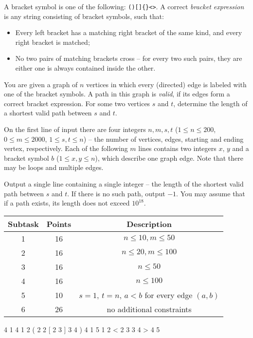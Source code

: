 










A bracket symbol is one of the following: \texttt{()[]\{\}<>}. A correct \textit{bracket expression} is any string consisting of bracket symbols, such that:
\begin{itemize}
 \item Every left bracket has a matching right bracket of the same kind, and every right bracket is matched;
 \item No two pairs of matching brackets cross -- for every two such pairs, they are either one is always contained inside the other.
\end{itemize}

You are given a graph of $n$ vertices in which every (directed) edge is labeled with one of the bracket symbols. A path in this graph is \textit{valid}, if its edges form a correct bracket expression. For some two vertices $s$ and $t$, determine the length of a shortest valid path between $s$ and $t$.



On the first line of input there are four integers $n, m, s, t$ ($1 \leq n \leq 200$, $0 \leq m \leq 2000$, $1 \leq s, t \leq n$) -- the number of vertices, edges, starting and ending vertex, respectively.
Each of the following $m$ lines contains two integers $x$, $y$ and a bracket symbol $b$ ($1 \leq x, y \leq n$), which describe one graph edge. Note that there may be loops and multiple edges.


Output a single line containing a single integer -- the length of the shortest valid path between $s$ and $t$. If there is no such path, output $-1$. You may assume that if a path exists, its length does not exceed $10^{18}$.


\begin{tabular}{|c|c|c|}
	\hline
	Subtask & Points  & Description \\
	\hline
	1 & 16 & $n \leq 10, m\leq 50$ \\
	\hline
	2 & 16 & $n \leq 20, m\leq 100$\\
	\hline
	3 & 16 & $n \leq 50$\\
	\hline
	4 & 16 & $n \leq 100$ \\
	\hline
	5  & 10 & $s = 1$, $t = n$, $a < b$ for every edge $(a,b)$\\
	\hline
	6 & 26  & no additional constraints \\
	\hline
\end{tabular}



 4 1 4
1 2 (
2 2 [
2 3 ]
3 4 )
\sampleEND
{} 4 1 5
1 2 <
2 3 {
3 4 >
4 5 }

\sampleEND




